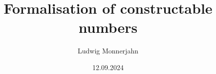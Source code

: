 \documentclass[11pt, a4paper]{report}
\author{Ludwig Monnerjahn}
\date{12.09.2024}
\title{Formalisation of constructable numbers}
\begin{document}
\maketitle


\clearpage
\tableofcontents

\clearpage

\clearpage






\nocite{*}
\end{document}
